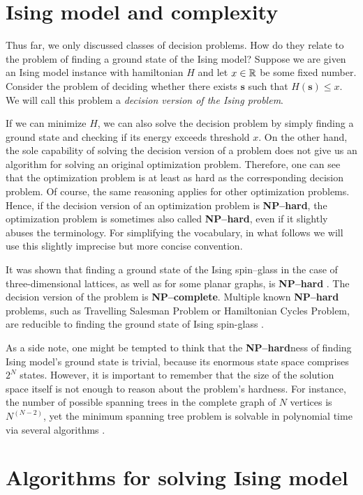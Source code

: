 \section{Ising model and complexity}

Thus far, we only discussed classes of decision problems. How do they relate to
the problem of finding a ground state of the Ising model? Suppose we are given
an Ising model instance with hamiltonian $H$ and let $x \in \mathbb{R}$ be some fixed
number. Consider the problem of deciding whether there exists $\mathbf{s}$ such
that $H(\mathbf{s}) \le x$. We will call this problem a \emph{decision version
  of the Ising problem}.

If we can minimize $H$, we can also solve the decision problem by simply
finding a ground state and checking if its energy exceeds threshold $x$. On the
other hand, the sole capability of solving the decision version of a problem
does not give us an algorithm for solving an original optimization problem.
Therefore, one can see that the optimization problem is at least as hard as the
corresponding decision problem. Of course, the same reasoning applies for other
optimization problems. Hence, if the decision version of an optimization
problem is \textbf{NP--hard}, the optimization problem is sometimes also called
\textbf{NP--hard}, even if it slightly abuses the terminology. For simplifying
the vocabulary, in what follows we will use this slightly imprecise but more
concise convention.

It was shown that finding a ground state of the Ising spin--glass in the case
of three-dimensional lattices, as well as for some planar graphs, is
\textbf{NP--hard} \cite{barahoma}. The decision version of the problem is
\textbf{NP--complete}. Multiple known \textbf{NP--hard} problems, such as
Travelling Salesman Problem or Hamiltonian Cycles Problem, are reducible to
finding the ground state of Ising spin-glass \cite{lucas}.

As a side note, one might be tempted to think that the \textbf{NP--hard}ness of
finding Ising model's ground state is trivial, because its enormous state space
comprises $2^{N}$ states. However, it is important to remember that the size of
the solution space itself is not enough to reason about the problem's hardness.
For instance, the number of possible spanning trees in the complete graph of
$N$ vertices is $N^{(N-2)}$, yet the minimum spanning tree problem is solvable
in polynomial time via several algorithms \cite{clrs}.

\section{Algorithms for solving Ising model}

